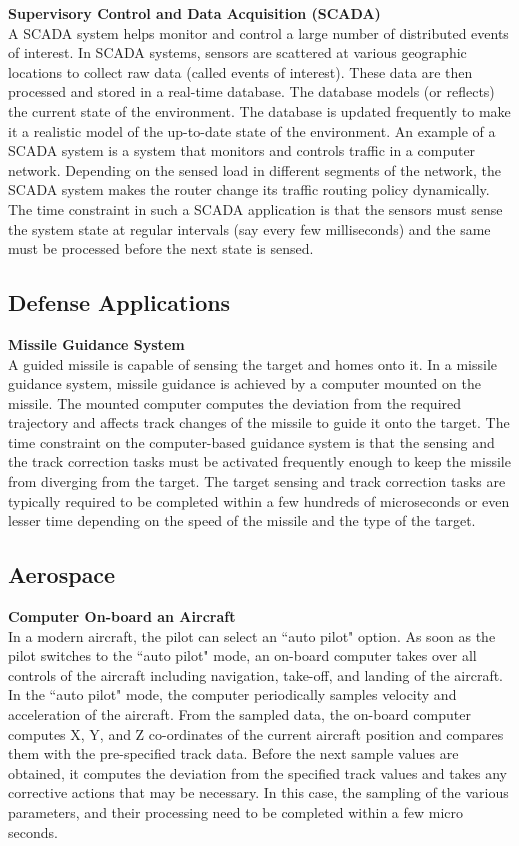 \documentclass[12pt]{report}
\begin{document}
\noindent\textbf{Supervisory Control and Data Acquisition (SCADA)}\\
A SCADA system helps monitor and control a large number of distributed events of interest. In SCADA systems, sensors are scattered at various geographic locations to collect raw data (called events of interest). These data are then processed and stored in a real-time database. The database models (or reflects) the current state of the environment. The database is updated frequently to make it a realistic model of the up-to-date state of the environment. An example of a SCADA system is a system that monitors and controls traffic in a computer network. Depending on the sensed load in different segments of the network, the SCADA system makes the router change its traffic routing policy dynamically. The time constraint in such a SCADA application is that the sensors must sense the system state at regular intervals (say every few milliseconds) and the same must be processed before the next state is sensed.

\subsection{Defense Applications}
\noindent\textbf{Missile Guidance System}\\
A guided missile is capable of sensing the target and homes onto it. In a missile guidance system, missile guidance is achieved by a computer mounted on the missile. The mounted computer computes the deviation from the required trajectory and affects track changes of the missile to guide it onto the target. The time constraint on the computer-based guidance system is that the sensing and the track correction tasks must be activated frequently enough to keep the missile from diverging from the target. The target sensing and track correction tasks are typically required to be completed within a few hundreds of microseconds or even lesser time depending on the speed of the missile and the type of the target. 

\subsection{Aerospace}
\noindent\textbf{Computer On-board an Aircraft}\\
In a modern aircraft, the pilot can select an ``auto pilot" option. As soon as the pilot switches to the ``auto pilot" mode, an on-board computer takes over all controls of the aircraft including navigation, take-off, and landing of the aircraft. In the ``auto pilot" mode, the computer periodically samples velocity and acceleration of the aircraft. From the sampled data, the on-board computer computes X, Y, and Z co-ordinates of the current aircraft position and compares them with the pre-specified track data. Before the next sample values are obtained, it computes the deviation from the specified track values and takes any corrective actions that may be necessary. In this case, the sampling of the various parameters, and their processing need to be completed within a few micro seconds. \\
\end{document}
